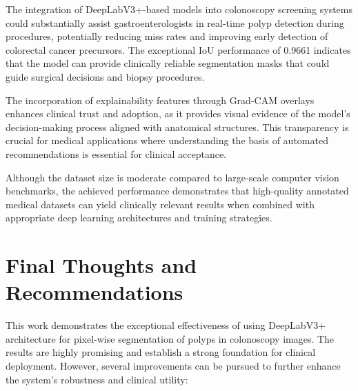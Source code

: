 \documentclass[a4paper,12pt]{report}
\begin{document}
The integration of DeepLabV3+-based models into colonoscopy screening systems could substantially assist gastroenterologists in real-time polyp detection during procedures, potentially reducing miss rates and improving early detection of colorectal cancer precursors. The exceptional IoU performance of 0.9661 indicates that the model can provide clinically reliable segmentation masks that could guide surgical decisions and biopsy procedures.

The incorporation of explainability features through Grad-CAM overlays enhances clinical trust and adoption, as it provides visual evidence of the model's decision-making process aligned with anatomical structures. This transparency is crucial for medical applications where understanding the basis of automated recommendations is essential for clinical acceptance.

Although the dataset size is moderate compared to large-scale computer vision benchmarks, the achieved performance demonstrates that high-quality annotated medical datasets can yield clinically relevant results when combined with appropriate deep learning architectures and training strategies.

\section{Final Thoughts and Recommendations}

This work demonstrates the exceptional effectiveness of using DeepLabV3+ architecture for pixel-wise segmentation of polyps in colonoscopy images. The results are highly promising and establish a strong foundation for clinical deployment. However, several improvements can be pursued to further enhance the system's robustness and clinical utility:
\end{document}
